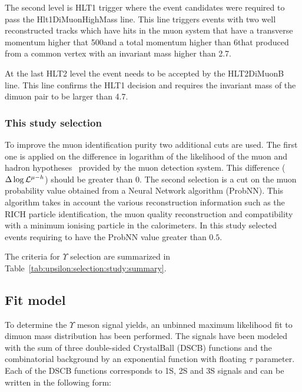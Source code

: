 The second level is HLT1 trigger where the event candidates were required to
pass the Hlt1DiMuonHighMass line.
This line triggers events with  two well reconstructed tracks  which have hits
in the muon system  that have a transverse momentum higher that 500\mevc and 
a total momentum higher than 6\gevc that produced from a common vertex with
an invariant mass higher than 2.7\gevcc.

At the last HLT2 level the event needs to be accepted by the HLT2DiMuonB line.
This line confirms the HLT1 decision and requires the invariant mass of the
dimuon pair to be larger than 4.7\gevcc.

\subsubsection{This study selection}
\label{sec:upsilon:selection:study}

To improve the muon identification purity two additional cuts are used. The
first one is applied on the difference in logarithm of the likelihood of the
muon and hadron hypotheses~\cite{Powell} provided by the muon detection system.
This difference ($\Delta\log\mathcal{L}^{\mu-h}$) should be greater than 0. The
second selection  is a cut on the muon probability value obtained from a Neural
Network algorithm (ProbNN). This algorithm takes in account the various
reconstruction information such as the RICH particle identification, the muon
quality reconstruction and compatibility with a minimum ionising particle in the
calorimeters. In this study selected events requiring to have the ProbNN value
greater than $0.5$.

The criteria for  $\Upsilon$ selection are summarized in
Table~\ref{tab:upsilon:selection:study:summary}.



\subsection{Fit model}
\label{sec:upsilon:fit}
To determine the $\Upsilon$ meson signal yields, an unbinned maximum likelihood
fit to dimuon mass distribution has been performed. The signals have been
modeled with the sum of three double-sided CrystalBall (DSCB) functions and the
combinatorial background by an exponential function with floating $\tau$
parameter. Each of the DSCB functions corresponds to \Y1S, \Y2S and \Y3S
signals and can be written in the following form:

